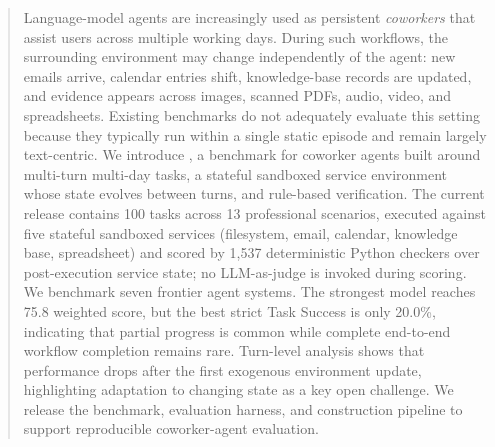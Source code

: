 
\begin{abstract}
Language-model agents are increasingly used as persistent \emph{coworkers} that assist users across multiple working days. During such workflows, the surrounding environment may change independently of the agent: new emails arrive, calendar entries shift, knowledge-base records are updated, and evidence appears across images, scanned PDFs, audio, video, and spreadsheets. Existing benchmarks do not adequately evaluate this setting because they typically run within a single static episode and remain largely text-centric. We introduce \bench{}, a benchmark for coworker agents built around multi-turn multi-day tasks, a stateful sandboxed service environment whose state evolves between turns, and rule-based verification. The current release contains 100 tasks across 13 professional scenarios, executed against five stateful sandboxed services (filesystem, email, calendar, knowledge base, spreadsheet) and scored by 1{,}537 deterministic Python checkers over post-execution service state; no LLM-as-judge is invoked during scoring. We benchmark seven frontier agent systems. The strongest model reaches 75.8 weighted score, but the best strict Task Success is only 20.0\%, indicating that partial progress is common while complete end-to-end workflow completion remains rare. Turn-level analysis shows that performance drops after the first exogenous environment update, highlighting adaptation to changing state as a key open challenge. We release the benchmark, evaluation harness, and construction pipeline to support reproducible coworker-agent evaluation.
\end{abstract}
